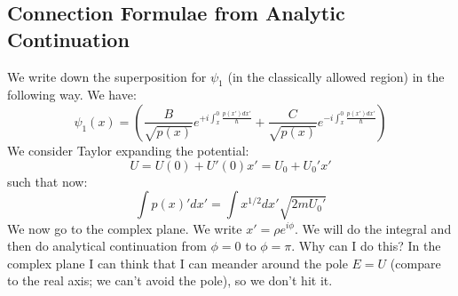 \subsection{Connection Formulae from Analytic Continuation}
We write down the superposition for $\psi_1$ (in the classically allowed region) in the following way. We have:
\begin{equation}
    \psi_1(x) = \left(\frac{B}{\sqrt{p(x)}}e^{+i\int_x^0 \frac{p(x')dx'}{\hbar}} + \frac{C}{\sqrt{p(x)}}e^{-i\int_x^0 \frac{p(x')dx'}{\hbar}}\right)
\end{equation}
We consider Taylor expanding the potential:
\begin{equation}
    U = U(0) + U'(0) x' = U_0 + U_0' x'
\end{equation}
such that now:
\begin{equation}
   \int  p(x)' dx' = \int x^{1/2}dx'\sqrt{2mU_0'}
\end{equation}
We now go to the complex plane. We write $x' = \rho e^{i\phi}$. We will do the integral and then do analytical continuation from $\phi = 0$ to $\phi = \pi$. Why can I do this? In the complex plane I can think that I can meander around the pole $E = U$ (compare to the real axis; we can't avoid the pole), so we don't hit it.

